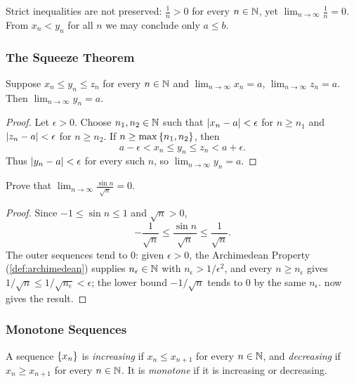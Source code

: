Strict inequalities are not preserved: $\frac1n>0$ for every $n\in\mathbb{N}$, yet $\lim_{n\to\infty}\frac1n=0$. From $x_n<y_n$ for all $n$ we may conclude only $a\leq b$.

\subsubsection{The Squeeze Theorem}
\begin{theorem}\label{thm:squeeze}
    Suppose $x_n\leq y_n\leq z_n$ for every $n\in\mathbb{N}$ and $\lim_{n\to\infty}x_n=a$, $\lim_{n\to\infty}z_n=a$. Then $\lim_{n\to\infty}y_n=a$.
\end{theorem}
\begin{proof}
    Let $\epsilon>0$. Choose $n_1,n_2\in\mathbb{N}$ such that $\left|x_n-a\right|<\epsilon$ for $n\geq n_1$ and $\left|z_n-a\right|<\epsilon$ for $n\geq n_2$. If $n\geq\max\left\{n_1,n_2\right\}$, then
    \[
        a-\epsilon<x_n\leq y_n\leq z_n<a+\epsilon.
    \]
    Thus $\left|y_n-a\right|<\epsilon$ for every such $n$, so $\lim_{n\to\infty}y_n=a$.
\end{proof}

\begin{example}\label{ex:sin-over-sqrt}
    Prove that $\lim_{n\to\infty}\frac{\sin n}{\sqrt n}=0$.
\end{example}
\begin{proof}
    Since $-1\leq\sin n\leq1$ and $\sqrt n>0$,
    \[
        -\frac1{\sqrt n}\leq\frac{\sin n}{\sqrt n}\leq\frac1{\sqrt n}.
    \]
    The outer sequences tend to $0$: given $\epsilon>0$, the Archimedean Property (\cref{def:archimedean}) supplies $n_\epsilon\in\mathbb{N}$ with $n_\epsilon>1/\epsilon^2$, and every $n\geq n_\epsilon$ gives $1/\sqrt n\leq1/\sqrt{n_\epsilon}<\epsilon$; the lower bound $-1/\sqrt n$ tends to $0$ by the same $n_\epsilon$.  now gives the result.
\end{proof}

\subsubsection{Monotone Sequences}
\begin{definition}\label{def:monotone}
    A sequence $\left\{x_n\right\}$ is \emph{increasing} if $x_n\leq x_{n+1}$ for every $n\in\mathbb{N}$, and \emph{decreasing} if $x_n\geq x_{n+1}$ for every $n\in\mathbb{N}$. It is \emph{monotone} if it is increasing or decreasing.
\end{definition}

